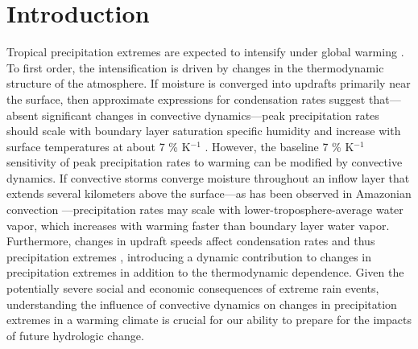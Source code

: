 \documentclass[twocol]{ametsoc}
\begin{document}

\section{Introduction}

Tropical precipitation extremes are expected to intensify under global warming \citep[e.g.][]{IPCC2013ClimateChange,Allen2002ConstraintsCycle,Pendergrass2014ChangesWarming}. To first order, the intensification is driven by changes in the thermodynamic structure of the atmosphere. If moisture is converged into updrafts primarily near the surface, then approximate expressions for condensation rates suggest that---absent significant changes in convective dynamics---peak precipitation rates should scale with boundary layer saturation specific humidity and increase with surface temperatures at about 7 \% K$^{-1}$ \citep[e.g.][]{OGorman2009TheChange,Muller2011IntensificationModel}. However, the baseline 7 \% K$^{-1}$ sensitivity of peak precipitation rates to warming can be modified by convective dynamics. If convective storms converge moisture throughout an inflow layer that extends several kilometers above the surface---as has been observed in Amazonian convection \citep{Schiro2018GoAmazon2014/5Scales}---precipitation rates may scale with lower-troposphere-average water vapor, which increases with warming faster than boundary layer water vapor. Furthermore, changes in updraft speeds affect condensation rates and thus precipitation extremes \citep[e.g.][]{Emori2005DynamicClimate,OGorman2009TheChange,Muller2011IntensificationModel,Romps2011ResponseWarming,Pendergrass2016TheSimulations}, introducing a dynamic contribution to changes in precipitation extremes in addition to the thermodynamic dependence. Given the potentially severe social and economic consequences of extreme rain events, understanding the influence of convective dynamics on changes in precipitation extremes in a warming climate is crucial for our ability to prepare for the impacts of future hydrologic change.
\end{document}
